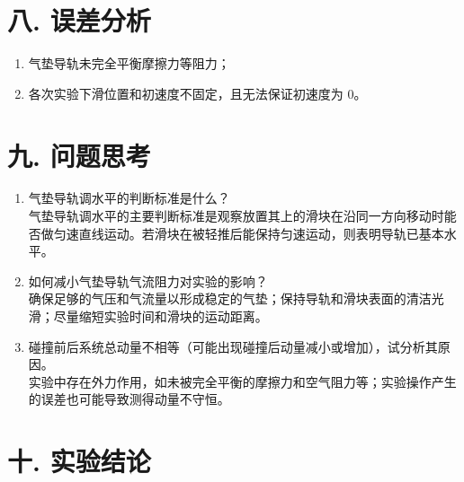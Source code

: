\documentclass[12pt,a4paper]{article}
\begin{document}
	\section*{\textbf{八. 误差分析}}

	\begin{enumerate}
		\item 气垫导轨未完全平衡摩擦力等阻力；
		\item 各次实验下滑位置和初速度不固定，且无法保证初速度为 0。
	\end{enumerate}

	\section*{\textbf{{九. 问题思考}}}

	\begin{enumerate}
			\item 气垫导轨调水平的判断标准是什么？\\
			气垫导轨调水平的主要判断标准是观察放置其上的滑块在沿同一方向移动时能否做匀速直线运动。若滑块在被轻推后能保持匀速运动，则表明导轨已基本水平。
		
			\item 如何减小气垫导轨气流阻力对实验的影响？\\
			确保足够的气压和气流量以形成稳定的气垫；保持导轨和滑块表面的清洁光滑；尽量缩短实验时间和滑块的运动距离。
		
			\item 碰撞前后系统总动量不相等（可能出现碰撞后动量减小或增加），试分析其原因。\\
			实验中存在外力作用，如未被完全平衡的摩擦力和空气阻力等；实验操作产生的误差也可能导致测得动量不守恒。
		\end{enumerate}


	
	\section*{\textbf{{十. 实验结论}}}
\end{document}
